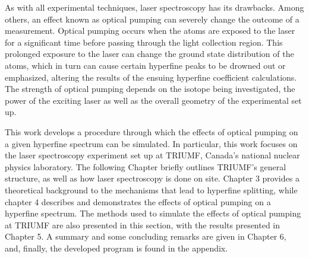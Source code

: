 As with all experimental techniques, laser spectroscopy has its drawbacks. Among others, an effect known as optical pumping can severely change the outcome of a measurement. Optical pumping occurs when the atoms are exposed to the laser for a significant time before passing through the light collection region. This prolonged exposure to the laser can change the ground state distribution of the atoms, which in turn can cause certain hyperfine peaks to be drowned out or emphasized, altering the results of the ensuing hyperfine coefficient calculations. The strength of optical pumping depends on the isotope being investigated, the power of the exciting laser as well as the overall geometry of the experimental set up.

This work develops a procedure through which the effects of optical pumping on a given hyperfine spectrum can be simulated. In particular, this work focuses on the laser spectroscopy experiment set up at TRIUMF, Canada's national nuclear physics laboratory. The following Chapter briefly outlines TRIUMF's general structure, as well as how laser spectroscopy is done on site. Chapter 3 provides a theoretical background to the mechanisms that lead to hyperfine splitting, while chapter 4 describes and demonstrates the effects of optical pumping on a hyperfine spectrum. The methods used to simulate the effects of optical pumping at TRIUMF are also presented in this section, with the results presented in Chapter 5. A summary and some concluding remarks are given in Chapter 6, and, finally, the developed program is found in the appendix. 